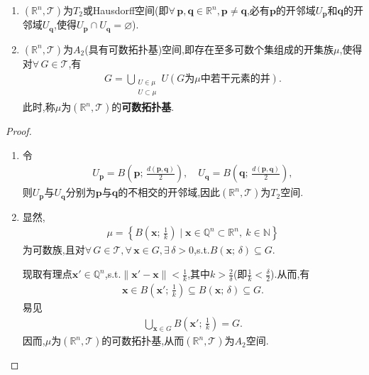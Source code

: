 \documentclass[../../main.tex]{subfiles}%
\begin{document}
\begin{lemma}\label{lemma:实变函数--引理1.4.6}
\begin{enumerate}[(1)]
\item\label{lemma:实变函数--引理1.4.6-1} $(\mathbb{R}^n,\mathcal{T})$为$T_2$或Hausdorff空间(即$\forall\,\boldsymbol{p},\boldsymbol{q}\in\mathbb{R}^n,\boldsymbol{p}\neq\boldsymbol{q}$,必有$\boldsymbol{p}$的开邻域$U_{\boldsymbol{p}}$和$\boldsymbol{q}$的开邻域$U_{\boldsymbol{q}}$,使得$U_{\boldsymbol{p}}\cap U_{\boldsymbol{q}}=\varnothing$).

\item\label{lemma:实变函数--引理1.4.6-2} $(\mathbb{R}^n,\mathcal{T})$为$A_2$(具有可数拓扑基)空间,即存在至多可数个集组成的开集族$\mu$,使得对$\forall\,G\in\mathcal{T}$,有
\begin{align*}
G=\bigcup_{\substack{U\in\mu\\U\subset\mu}}U(G\text{为}\mu\text{中若干元素的并}).
\end{align*}
此时,称$\mu$为$(\mathbb{R}^n,\mathcal{T})$的\textbf{可数拓扑基}.
\end{enumerate}
\end{lemma}
\begin{proof}
\begin{enumerate}[(1)]
\item 令
\begin{align*}
U_{\boldsymbol{p}}=B\left(\boldsymbol{p};\,\frac{d(\boldsymbol{p},\boldsymbol{q})}{2}\right),\quad U_{\boldsymbol{q}}=B\left(\boldsymbol{q};\,\frac{d(\boldsymbol{p},\boldsymbol{q})}{2}\right),
\end{align*}
则$U_{\boldsymbol{p}}$与$U_{\boldsymbol{q}}$分别为$\boldsymbol{p}$与$\boldsymbol{q}$的不相交的开邻域,因此$(\mathbb{R}^n,\mathcal{T})$为$T_2$空间.

\item 显然,
\begin{align*}
\mu=\left\{B\left(\boldsymbol{x};\,\frac{1}{k}\right)\mid \boldsymbol{x}\in\mathbb{Q}^n\subset\mathbb{R}^n,\ k\in\mathbb{N}\right\}
\end{align*}
为可数族,且对$\forall\,G\in\mathcal{T},\forall\,\boldsymbol{x}\in G,\exists\,\delta>0$,s.t.$B(\boldsymbol{x};\,\delta)\subseteq G$.

现取有理点$\boldsymbol{x}'\in\mathbb{Q}^n$,s.t.$\|\boldsymbol{x}'-\boldsymbol{x}\|<\frac{1}{k}$,其中$k>\frac{2}{\delta}$(即$\frac{1}{k}<\frac{\delta}{2}$).从而,有
\begin{align*}
\boldsymbol{x}\in B\left(\boldsymbol{x}';\,\frac{1}{k}\right)\subseteq B(\boldsymbol{x};\,\delta)\subseteq G.
\end{align*}
易见
\begin{align*}
\bigcup_{\boldsymbol{x}\in G}B\left(\boldsymbol{x}';\,\frac{1}{k}\right)=G.
\end{align*}
因而,$\mu$为$(\mathbb{R}^n,\mathcal{T})$的可数拓扑基,从而$(\mathbb{R}^n,\mathcal{T})$为$A_2$空间.
\end{enumerate}
\end{proof}
\end{document}
